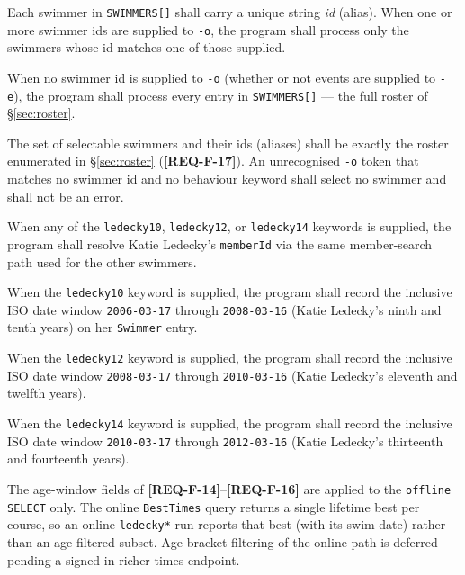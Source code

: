 \documentclass[12pt]{article}
\newcommand{\code}[1]{\texttt{#1}}
\newcommand{\req}[1]{\textbf{[#1]}}
\begin{document}
\begin{description}[style=nextline]
  \item[\req{REQ-F-10}] Each swimmer in \texttt{SWIMMERS[]} shall
        carry a unique string \emph{id} (alias).  When one or more
        swimmer ids are supplied to \code{-o}, the program shall
        process only the swimmers whose id matches one of those
        supplied.
  \item[\req{REQ-F-11}] When no swimmer id is supplied to \code{-o}
        (whether or not events are supplied to \code{-e}), the
        program shall process every entry in \texttt{SWIMMERS[]} ---
        the full roster of \S\ref{sec:roster}.
  \item[\req{REQ-F-12}] The set of selectable swimmers and their ids
        (aliases) shall be exactly the roster enumerated in
        \S\ref{sec:roster} (\req{REQ-F-17}).  An unrecognised
        \code{-o} token that matches no swimmer id and no behaviour
        keyword shall select no swimmer and shall not be an error.
  \item[\req{REQ-F-13}] When any of the \code{ledecky10},
        \code{ledecky12}, or \code{ledecky14} keywords is
        supplied, the program shall resolve Katie Ledecky's
        \code{memberId} via the same member-search path used for
        the other swimmers.
  \item[\req{REQ-F-14}] When the \code{ledecky10} keyword is
        supplied, the program shall record the inclusive ISO date
        window \code{2006-03-17} through \code{2008-03-16}
        (Katie Ledecky's ninth and tenth years) on her
        \code{Swimmer} entry.
  \item[\req{REQ-F-15}] When the \code{ledecky12} keyword is
        supplied, the program shall record the inclusive ISO date
        window \code{2008-03-17} through \code{2010-03-16}
        (Katie Ledecky's eleventh and twelfth years).
  \item[\req{REQ-F-16}] When the \code{ledecky14} keyword is
        supplied, the program shall record the inclusive ISO date
        window \code{2010-03-17} through \code{2012-03-16}
        (Katie Ledecky's thirteenth and fourteenth years).
  \item[\req{REQ-F-16a}] The age-window fields of
        \req{REQ-F-14}--\req{REQ-F-16} are applied to the
        \code{offline} \texttt{SELECT} only.  The online
        \code{BestTimes} query returns a single lifetime best per
        course, so an online \code{ledecky*} run reports that best
        (with its swim date) rather than an age-filtered subset.
        Age-bracket filtering of the online path is deferred pending
        a signed-in richer-times endpoint.
\end{description}
\end{document}
